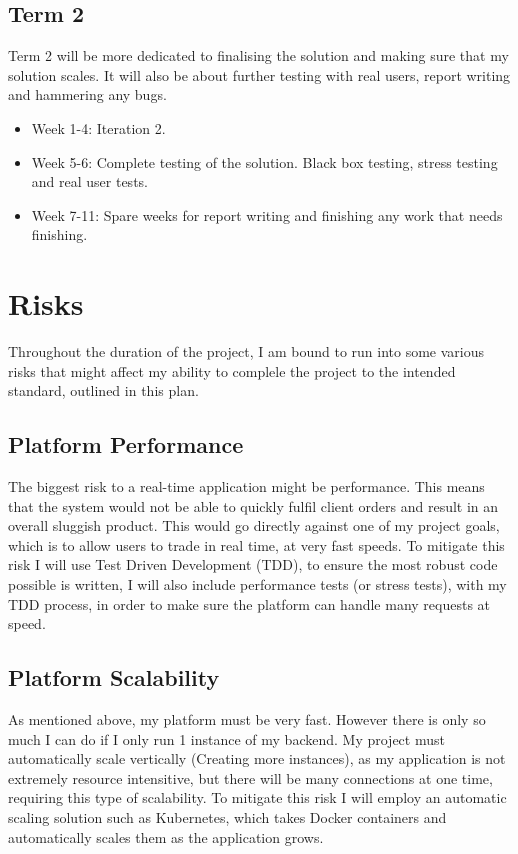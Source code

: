\documentclass[titlepage]{article}
\begin{document}
\subsection{Term 2}
Term 2 will be more dedicated to finalising the solution and making sure that my solution scales. It will also be about further testing with real users, report writing and hammering any bugs.

\begin{itemize}
	\item Week 1-4: Iteration 2.
	\item Week 5-6: Complete testing of the solution. Black box testing, stress testing and real user tests.
	\item Week 7-11: Spare weeks for report writing and finishing any work that needs finishing.
\end{itemize}

\pagebreak

\section{Risks}
Throughout  the duration of the project, I am bound to run into some various risks that might affect my ability to complele the project to the intended standard, outlined in this plan.

\subsection{Platform Performance}
The biggest risk to a real-time application might be performance. This means that the system would not be able to quickly fulfil client orders and result in an overall sluggish product. This would go directly against one of my project goals, which is to allow users to trade in real time, at very fast speeds. To mitigate this risk I will use Test Driven Development (TDD), to ensure the most robust code possible is written, I will also include performance tests (or stress tests), with my TDD process, in order to make sure the platform can handle many requests at speed.

\subsection{Platform Scalability}
As mentioned above, my platform must be very fast. However there is only so much I can do if I only run 1 instance of my backend. My project must automatically scale vertically (Creating more instances), as my application is not extremely resource intensitive, but there will be many connections at one time, requiring this type of scalability. To mitigate this risk I will employ an automatic scaling solution such as Kubernetes, which takes Docker containers and automatically scales them as the application grows.
\end{document}

